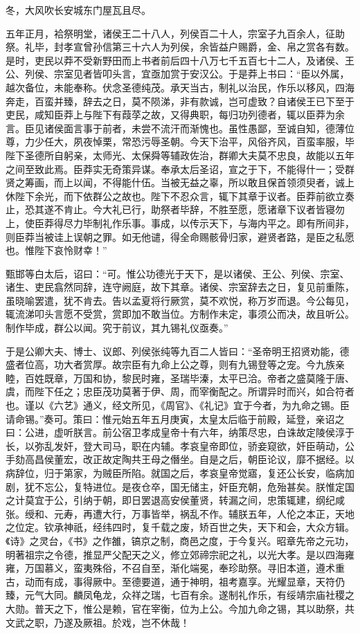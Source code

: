 \documentclass[12pt,UTF8]{ctexbook}
\begin{document}
冬，大风吹长安城东门屋瓦且尽。



五年正月，袷祭明堂，诸侯王二十八人，列侯百二十人，宗室子九百余人，征助祭。礼毕，封孝宣曾孙信第三十六人为列侯，余皆益户赐爵，金、帛之赏各有数。是时，吏民以莽不受新野田而上书者前后四十八万七千五百七十二人，及诸侯、王公、列侯、宗室见者皆叩头言，宜亟加赏于安汉公。于是莽上书曰：“臣以外属，越次备位，未能奉称。伏念圣德纯茂。承天当古，制礼以治民，作乐以移风，四海奔走，百蛮并臻，辞去之日，莫不陨涕，非有款诚，岂可虚致？自诸侯王已下至于吏民，咸知臣莽上与陛下有葭莩之故，又得典职，每归功列德者，辄以臣莽为余言。臣见诸侯面言事于前者，未尝不流汗而渐愧也。虽性愚鄙，至诚自知，德薄位尊，力少任大，夙夜悼栗，常恐污辱圣朝。今天下治平，风俗齐风，百蛮率服，毕陛下圣德所自躬亲，太师光、太保舜等辅政佐治，群卿大夫莫不忠良，故能以五年之间至致此焉。臣莽实无奇策异谋。奉承太后圣诏，宣之于下，不能得什一；受群贤之筹画，而上以闻，不得能什伍。当被无益之辜，所以敢且保首领须臾者，诚上休陛下余光，而下依群公之故也。陛下不忍众言，辄下其章于议者。臣莽前欲立奏止，恐其遂不肯止。今大礼已行，助祭者毕辞，不胜至愿，愿诸章下议者皆寝勿上，使臣莽得尽力毕制礼作乐事。事成，以传示天下，与海内平之。即有所间非，则臣莽当被诖上误朝之罪。如无他谴，得全命赐骸骨归家，避贤者路，是臣之私愿也。惟陛下哀怜财幸！”



甄邯等白太后，诏曰：“可。惟公功德光于天下，是以诸侯、王公、列侯、宗室、诸生、吏民翕然同辞，连守阙庭，故下其章。诸侯、宗室辞去之日，复见前重陈，虽晓喻罢遣，犹不肯去。告以孟夏将行厥赏，莫不欢悦，称万岁而退。今公每见，辄流涕叩头言愿不受赏，赏即加不敢当位。方制作未定，事须公而决，故且听公。制作毕成，群公以闻。究于前议，其九锡礼仪亟奏。”



于是公卿大夫、博士、议郎、列侯张纯等九百二人皆曰：“圣帝明王招贤劝能，德盛者位高，功大者赏厚。故宗臣有九命上公之尊，则有九锡登等之宠。今九族亲睦，百姓既章，万国和协，黎民时雍，圣瑞毕溱，太平已洽。帝者之盛莫隆于唐、虞，而陛下任之；忠臣茂功莫著于伊、周，而宰衡配之。所谓异时而兴，如合符者也。谨以《六艺》通义，经文所见，《周官》、《礼记》宜于今者，为九命之锡。臣请命锡。”奏可。策曰：惟元始五年五月庚寅，太皇太后临于前殿，延登，亲诏之曰：公进，虚听朕言。前公宿卫孝成皇帝十有六年，纳策尽忠，白诛故定陵侯淳于长，以弥乱发奸，登大司马，职在内辅。孝哀皇帝即位，骄妾窥欲，奸臣萌动，公手劾高昌侯董宏，改正故定陶共王母之僭坐。自是之后，朝臣论议，靡不据经。以病辞位，归于第家，为贼臣所陷。就国之后，孝哀皇帝觉寤，复还公长安，临病加剧，犹不忘公，复特进位。是夜仓卒，国无储主，奸臣充朝，危殆甚矣。朕惟定国之计莫宜于公，引纳于朝，即日罢退高安侯董贤，转漏之间，忠策辄建，纲纪咸张。绶和、元寿，再遭大行，万事皆举，祸乱不作。辅朕五年，人伦之本正，天地之位定。钦承神祇，经纬四时，复千载之废，矫百世之失，天下和会，大众方辑。《诗》之灵台，《书》之作雒，镐京之制，商邑之度，于今复兴。昭章先帝之元功，明著祖宗之令德，推显严父配天之义，修立郊禘宗祀之礼，以光大孝。是以四海雍雍，万国慕义，蛮夷殊俗，不召自至，渐化端冕，奉珍助祭。寻旧本道，遵术重古，动而有成，事得厥中。至德要道，通于神明，祖考嘉享。光耀显章，天符仍臻，元气大同。麟凤龟龙，众祥之瑞，七百有余。遂制礼作乐，有绥靖宗庙社稷之大勋。普天之下，惟公是赖，官在宰衡，位为上公。今加九命之锡，其以助祭，共文武之职，乃遂及厥祖。於戏，岂不休哉！
\end{document}

